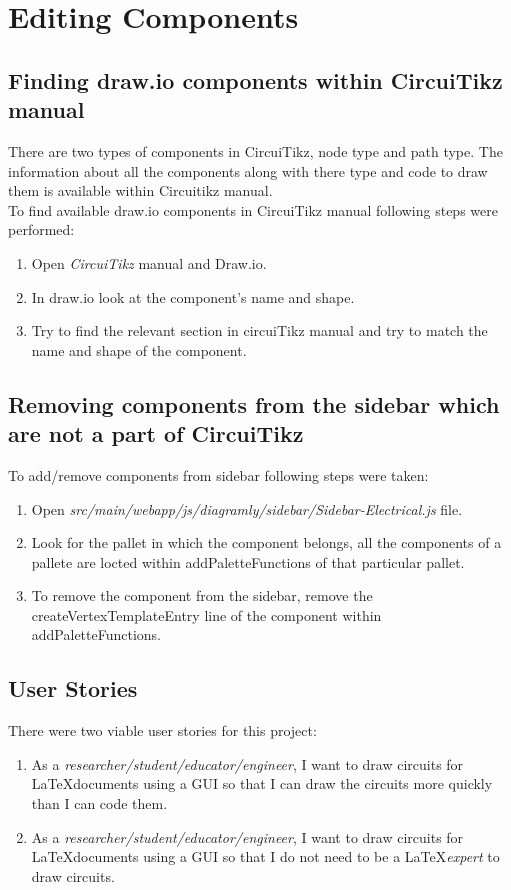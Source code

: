 %
\chapter{Editing Components}\label{ch:editing-components}

\section{Finding draw.io components within CircuiTikz manual}
There are two types of components in CircuiTikz, node type and path type. The information about all the components along with there type and code to draw them is available within Circuitikz manual.\\
To find available draw.io components in CircuiTikz manual following steps were performed:
\begin{enumerate}
    \item Open \emph{CircuiTikz} manual and Draw.io.
    \item In draw.io look at the component's name and shape.
    \item Try to find the relevant section in circuiTikz manual and try to match the name and shape of the component.
\end{enumerate}

\section{Removing components from the sidebar which are not a part of CircuiTikz}
To add/remove components from sidebar following steps were taken:
\begin{enumerate}
    \item Open \emph{src/main/webapp/js/diagramly/sidebar/Sidebar-Electrical.js} file.
    \item Look for the pallet in which the component belongs, all the components of a pallete are locted within addPaletteFunctions of that particular pallet.
    \item To remove the component from the sidebar, remove the createVertexTemplateEntry line of the component within addPaletteFunctions.
\end{enumerate}

\section{User Stories}\label{sec:user-stories}
There were two viable user stories for this project:
\begin{enumerate}
    \item As a \emph{researcher/student/educator/engineer}, I want to draw circuits for \LaTeX documents using a GUI so that I can draw the circuits more quickly than I can code them.
    \item As a \emph{researcher/student/educator/engineer}, I want to draw circuits for \LaTeX documents using a GUI so that I do not need to be a \LaTeX \emph{expert} to draw circuits.
\end{enumerate}

